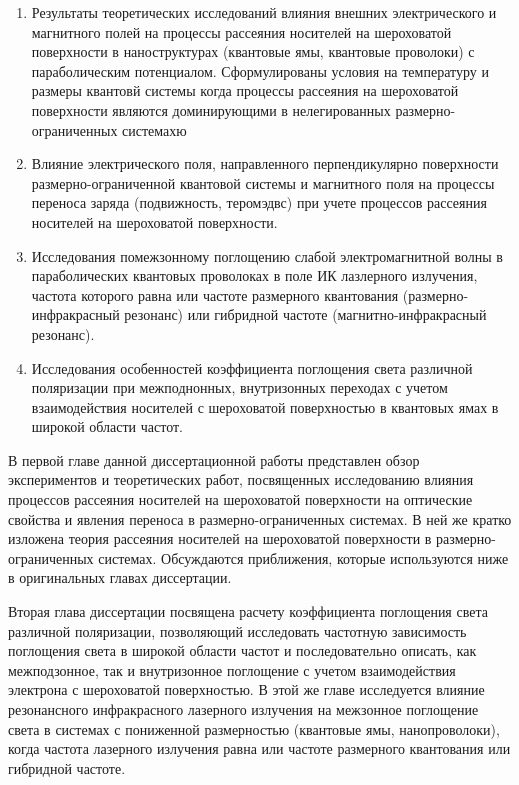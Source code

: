 {}
\begin{enumerate}
	\item Результаты теоретических исследований влияния внешних электрического и магнитного полей на процессы рассеяния носителей на шероховатой поверхности в наноструктурах (квантовые ямы, квантовые проволоки) с параболическим потенциалом. Сформулированы условия на температуру и размеры квантовй системы когда процессы рассеяния на шероховатой поверхности являются доминирующими в нелегированных размерно-ограниченных системахю
	\item Влияние электрического поля, направленного перпендикулярно поверхности размерно-ограниченной квантовой системы и магнитного поля на процессы переноса заряда (подвижность, теромэдвс) при учете процессов рассеяния носителей на шероховатой поверхности.
	\item Исследования помежзонному поглощению слабой электромагнитной волны в параболических квантовых проволоках в поле ИК лазлерного излучения, частота которого равна или частоте размерного квантования (размерно-инфракрасный резонанс) или гибридной частоте (магнитно-инфракрасный резонанс).
	\item Исследования особенностей коэффициента поглощения света различной поляризации при межподнонных, внутризонных переходах с учетом взаимодействия носителей с шероховатой поверхностью в квантовых ямах в широкой области частот.
\end{enumerate}

\ifsynopsis
\else
В первой главе данной диссертационной работы представлен обзор экспериментов и теоретических работ, посвященных исследованию влияния процессов рассеяния носителей на шероховатой поверхности на оптические свойства и явления переноса в размерно-ограниченных системах. В ней же кратко изложена теория рассеяния носителей на шероховатой поверхности в размерно-ограниченных системах. Обсуждаются приближения, которые используются ниже в оригинальных главах диссертации.

Вторая глава диссертации посвящена расчету коэффициента поглощения света различной поляризации, позволяющий исследовать частотную зависимость поглощения света в широкой области частот и последовательно описать, как межподзонное, так и внутризонное поглощение с учетом взаимодействия электрона с шероховатой поверхностью.
В этой же главе исследуется влияние резонансного инфракрасного лазерного излучения на межзонное поглощение света в системах с пониженной размерностью (квантовые ямы, нанопроволоки), когда частота лазерного излучения равна или частоте размерного квантования или гибридной частоте.

